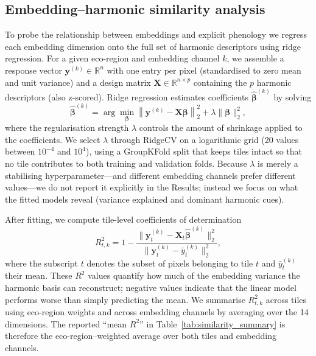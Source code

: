 \documentclass[utf8]{FrontiersinHarvard}
\begin{document}
\subsection{Embedding–harmonic similarity analysis}
To probe the relationship between embeddings and explicit phenology we regress each embedding dimension onto the full set of harmonic descriptors using ridge regression. For a given eco-region and embedding channel \(k\), we assemble a response vector \(\mathbf{y}^{(k)} \in \mathbb{R}^n\) with one entry per pixel (standardised to zero mean and unit variance) and a design matrix \(\mathbf{X} \in \mathbb{R}^{n \times p}\) containing the \(p\) harmonic descriptors (also z-scored). Ridge regression estimates coefficients \(\hat{\boldsymbol{\beta}}^{(k)}\) by solving
\begin{equation*}
    \hat{\boldsymbol{\beta}}^{(k)} = \arg\min_{\boldsymbol{\beta}} \left\| \mathbf{y}^{(k)} - \mathbf{X}\boldsymbol{\beta} \right\|_2^2 + \lambda \|\boldsymbol{\beta}\|_2^2,
\end{equation*}
where the regularisation strength \(\lambda\) controls the amount of shrinkage applied to the coefficients. We select \(\lambda\) through RidgeCV on a logarithmic grid (20 values between \(10^{-4}\) and \(10^{4}\)), using a GroupKFold split that keeps tiles intact so that no tile contributes to both training and validation folds. Because \(\lambda\) is merely a stabilising hyperparameter—and different embedding channels prefer different values—we do not report it explicitly in the Results; instead we focus on what the fitted models reveal (variance explained and dominant harmonic cues).

After fitting, we compute tile-level coefficients of determination
\begin{equation*}
    R^2_{t,k} = 1 - \frac{\|\mathbf{y}^{(k)}_t - \mathbf{X}_t \hat{\boldsymbol{\beta}}^{(k)}\|_2^2}{\|\mathbf{y}^{(k)}_t - \bar{y}^{(k)}_t\|_2^2},
\end{equation*}
where the subscript \(t\) denotes the subset of pixels belonging to tile \(t\) and \(\bar{y}^{(k)}_t\) their mean. These $R^2$ values quantify how much of the embedding variance the harmonic basis can reconstruct; negative values indicate that the linear model performs worse than simply predicting the mean. We summarise \(R^2_{t,k}\) across tiles using eco-region weights and across embedding channels by averaging over the 14 dimensions. The reported “mean $R^2$” in Table~\ref{tab:similarity_summary} is therefore the eco-region–weighted average over both tiles and embedding channels.
\end{document}
